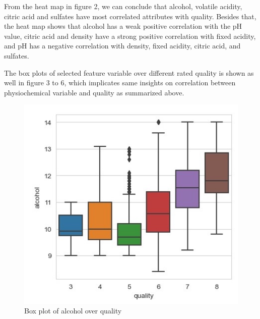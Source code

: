 \documentclass[conference]{IEEEtran}
\begin{document}
	From the heat map in figure 2, we can conclude that alcohol, volatile acidity, citric acid and sulfates have most correlated attributes with quality. Besides that, the heat map shows that alcohol has a weak positive correlation with the pH value, citric acid and density have a strong positive correlation with fixed acidity, and pH has a negative correlation with density, fixed acidity, citric acid, and sulfates.
	
	The box plots of selected feature variable over different rated quality is shown as well in figure 3 to 6, which implicates same insights on correlation between physiochemical variable and quality as summarized above.
	
	\begin{figure}[h]
	\label{fig:foo}
	\begin{center}
	\includegraphics[scale=0.55]{a.jpg}
	\caption{Box plot of alcohol over quality}
	\end{center}
	\end{figure}
	
\end{document}
